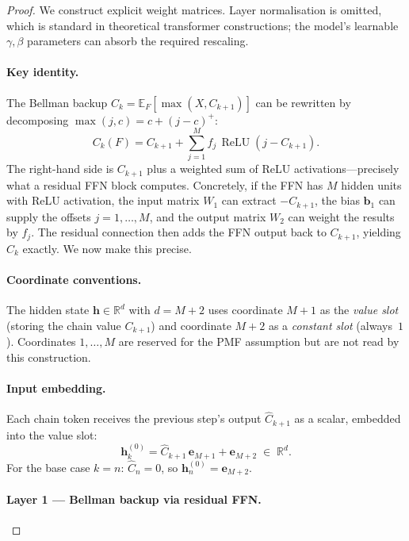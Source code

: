 \documentclass{article}
\begin{document}
\begin{proof}
We construct explicit weight matrices. Layer normalisation is omitted, which is standard in theoretical transformer constructions; the model's learnable $\gamma, \beta$ parameters can absorb the required rescaling.

\paragraph{Key identity.}
The Bellman backup $C_k = \mathbb{E}_F[\max(X, C_{k+1})]$ can be rewritten by decomposing $\max(j, c) = c + (j - c)^+$:
\begin{equation}
\label{eq:bellman-relu}
C_k(F) = C_{k+1} + \sum_{j=1}^{M} f_j \,\operatorname{ReLU}(j - C_{k+1}).
\end{equation}
The right-hand side is $C_{k+1}$ plus a weighted sum of ReLU activations---precisely what a residual FFN block computes. Concretely, if the FFN has $M$ hidden units with ReLU activation, the input matrix $W_1$ can extract $-C_{k+1}$, the bias $\mathbf{b}_1$ can supply the offsets $j = 1,\ldots,M$, and the output matrix $W_2$ can weight the results by $f_j$. The residual connection then adds the FFN output back to $C_{k+1}$, yielding $C_k$ exactly. We now make this precise.

\paragraph{Coordinate conventions.}
The hidden state $\mathbf{h} \in \mathbb{R}^d$ with $d = M + 2$ uses coordinate $M{+}1$ as the \emph{value slot} (storing the chain value $C_{k+1}$) and coordinate $M{+}2$ as a \emph{constant slot} (always~$1$). Coordinates $1,\ldots,M$ are reserved for the PMF assumption but are not read by this construction.

\paragraph{Input embedding.}
Each chain token receives the previous step's output $\hat C_{k+1}$ as a scalar, embedded into the value slot:
\[
\mathbf{h}_k^{(0)} = \hat C_{k+1}\,\mathbf{e}_{M+1} + \mathbf{e}_{M+2} \;\in\;\mathbb{R}^d.
\]
For the base case $k = n$: $\hat C_n = 0$, so $\mathbf{h}_n^{(0)} = \mathbf{e}_{M+2}$.

\paragraph{Layer 1 --- Bellman backup via residual FFN.}


\end{proof}
\end{document}
